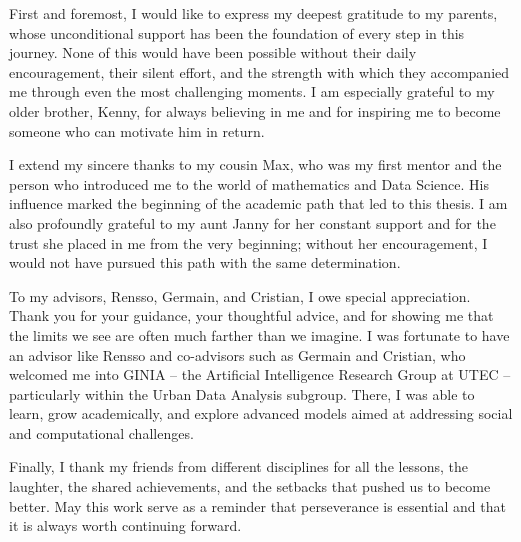\begin{agradecimientos}

First and foremost, I would like to express my deepest gratitude to my parents, whose unconditional support has been the foundation of every step in this journey. None of this would have been possible without their daily encouragement, their silent effort, and the strength with which they accompanied me through even the most challenging moments. I am especially grateful to my older brother, Kenny, for always believing in me and for inspiring me to become someone who can motivate him in return.

I extend my sincere thanks to my cousin Max, who was my first mentor and the person who introduced me to the world of mathematics and Data Science. His influence marked the beginning of the academic path that led to this thesis. I am also profoundly grateful to my aunt Janny for her constant support and for the trust she placed in me from the very beginning; without her encouragement, I would not have pursued this path with the same determination.

To my advisors, Rensso, Germain, and Cristian, I owe special appreciation. Thank you for your guidance, your thoughtful advice, and for showing me that the limits we see are often much farther than we imagine. I was fortunate to have an advisor like Rensso and co-advisors such as Germain and Cristian, who welcomed me into GINIA – the Artificial Intelligence Research Group at UTEC – particularly within the Urban Data Analysis subgroup. There, I was able to learn, grow academically, and explore advanced models aimed at addressing social and computational challenges.

Finally, I thank my friends from different disciplines for all the lessons, the laughter, the shared achievements, and the setbacks that pushed us to become better. May this work serve as a reminder that perseverance is essential and that it is always worth continuing forward.

\end{agradecimientos}
